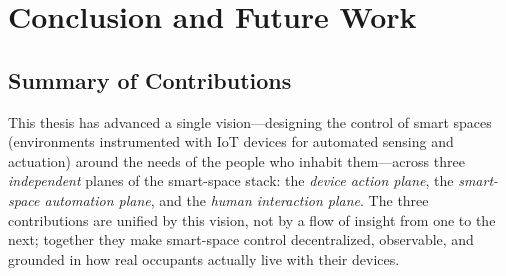 \section{Conclusion and Future Work}
\label{sec:conclusion}

\subsection{Summary of Contributions}
\label{conc:sec:summary}

This thesis has advanced a single vision---designing the control of smart spaces (environments instrumented with IoT devices for automated sensing and actuation) around the needs of the people who inhabit them---across three \emph{independent} planes of the smart-space stack: the \emph{device action plane}, the \emph{smart-space automation plane}, and the \emph{human interaction plane}. The three contributions are unified by this vision, not by a flow of insight from one to the next; together they make smart-space control decentralized, observable, and grounded in how real occupants actually live with their devices.


